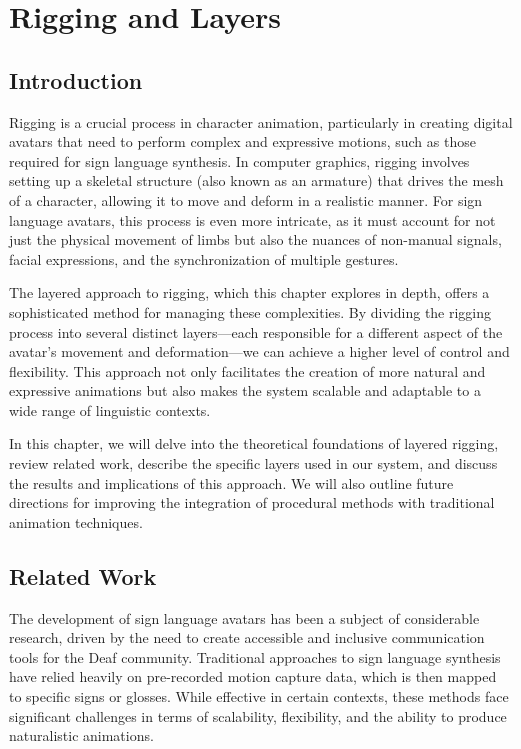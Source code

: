\documentclass[../../main.tex]{subfiles}
\begin{document}
\chapter{Rigging and Layers}
\label{ch:rigging_layers}

\section{Introduction}
Rigging is a crucial process in character animation, particularly in creating digital avatars that need to perform complex and expressive motions, such as those required for sign language synthesis. In computer graphics, rigging involves setting up a skeletal structure (also known as an armature) that drives the mesh of a character, allowing it to move and deform in a realistic manner. For sign language avatars, this process is even more intricate, as it must account for not just the physical movement of limbs but also the nuances of non-manual signals, facial expressions, and the synchronization of multiple gestures.

The layered approach to rigging, which this chapter explores in depth, offers a sophisticated method for managing these complexities. By dividing the rigging process into several distinct layers—each responsible for a different aspect of the avatar’s movement and deformation—we can achieve a higher level of control and flexibility. This approach not only facilitates the creation of more natural and expressive animations but also makes the system scalable and adaptable to a wide range of linguistic contexts.

In this chapter, we will delve into the theoretical foundations of layered rigging, review related work, describe the specific layers used in our system, and discuss the results and implications of this approach. We will also outline future directions for improving the integration of procedural methods with traditional animation techniques.

\section{Related Work}
The development of sign language avatars has been a subject of considerable research, driven by the need to create accessible and inclusive communication tools for the Deaf community. Traditional approaches to sign language synthesis have relied heavily on pre-recorded motion capture data, which is then mapped to specific signs or glosses. While effective in certain contexts, these methods face significant challenges in terms of scalability, flexibility, and the ability to produce naturalistic animations.
\end{document}
